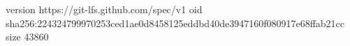 version https://git-lfs.github.com/spec/v1
oid sha256:224324799970253ced1ae0d8458125eddbd40de3947160f080917e68ffab21cc
size 43860
